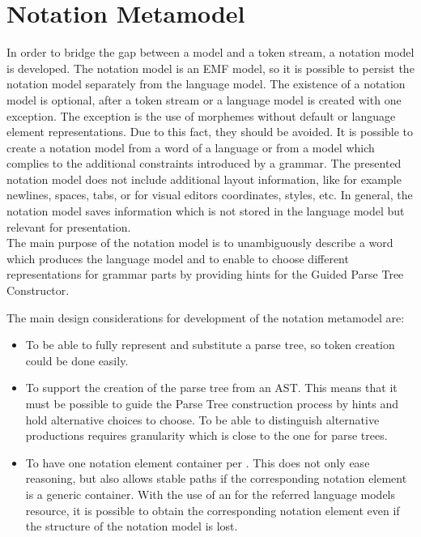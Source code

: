 \section{Notation Metamodel} \label{chp:NotMM}
In order to bridge the gap between a model and a token stream, a notation model is developed. The notation model is an EMF model, so it is possible to persist the notation model separately from the language model. The existence of a notation model is optional, after a token stream or a language model is created with one exception. The exception is the use of morphemes without default or language element representations. Due to this fact, they should be avoided. It is possible to create a notation model from a word of a language or from a model which complies to the additional constraints introduced by a grammar. The presented notation model does not include additional layout information, like for example newlines, spaces, tabs, or for visual editors coordinates, styles, etc. In general, the notation model saves information which is not stored in the language model but relevant for presentation.\\

The main purpose of the notation model is to unambiguously describe a word which produces the language model and to enable to choose different representations for grammar parts by providing hints for the Guided Parse Tree Constructor.

The main design considerations for development of the notation metamodel are:
\begin{itemize}
	\item To be able to fully represent and substitute a parse tree, so token creation could be done easily.
	\item To support the creation of the parse tree from an AST. This means that it must be possible to guide the Parse Tree construction process by hints and hold alternative choices to choose. To be able to distinguish alternative productions requires granularity which is close to the one for parse trees.
	\item To have one notation element container per . This does not only ease reasoning, but also allows stable paths if the corresponding notation element is a generic container. With the use of an  for the referred language models resource, it is possible to obtain the corresponding notation element even if the structure of the notation model is lost. 
\end{itemize}

